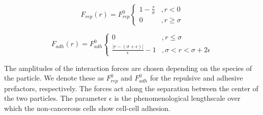 \documentclass[aps,prb,twocolumn,groupedaddress,nofootinbib,floatfix]{revtex4}
\begin{document}
\begin{equation}
  F_{rep}(r) = F^0_{rep} \left\{ 
    \begin{array}{lr}
      1-\frac{r}{\sigma} &, r < 0\\
      0 &, r \ge \sigma
    \end{array}
  \right.
  \label{eq:frep}
\end{equation}

\begin{equation}
  F_{adh}(r) =F^0_{adh} \left\{
    \begin{array}{lr}
      0 &, r \le \sigma \\
      \frac{|r - (\sigma+\epsilon)|}{\epsilon}-1 &, \sigma < r < \sigma+2\epsilon
    \end{array}
  \right.
  \label{eq:fadh}
\end{equation}

The amplitudes of the interaction forces are chosen depending on the species of the particle. We denote these as $F^0_{rep}$ and $F^0_{adh}$ for the repulsive and adhesive prefactors, respectively.
The forces act along the separation between the center of the two particles. 
The parameter $\epsilon$ is the phenomenological lengthscale over which the non-cancerous cells show cell-cell adhesion. 
\end{document}
